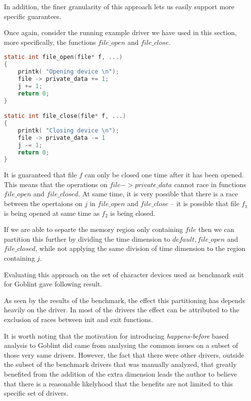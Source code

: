 \documentclass[..thesis.tex]{subfiles}
\begin{document}


In addition, the finer granularity of this approach lets us easily support more specific guarantees.

Once again, consider the running example driver we have used in this section, more specifically, the functions $file\_open$ and $file\_close$.

\begin{lstlisting}[language=c,style=def]
static int file_open(file* f, ...)
{
    printk( "Opening device \n");
    file -> private_data += 1;
    j += 1;
    return 0;
}

static int file_close(file* f, ...)
{
    printk( "Closing device \n");
    file -> private_data -= 1
    j -= 1;
    return 0;
}
\end{lstlisting}

It is guaranteed that file $f$ can only be closed one time after it has been opened. This means that the operations on $file -> private\_data$ cannot race in functions $file\_open$ and $file\_closed$. At same time, it is very possible that there is a race between the opertaions on $j$ in $file\_open$ and $file\_close$ -- it is possible that file $f_1$ is being opened at same time as $f_2$ is being closed. 

If we are able to separte the memory region only containing $file$ then we can partition this further by dividing the time dimension to $default, file\_open$ and $file\_closed$, while not applying the same division of time dimension to the region containing $j$. 


Evaluating this approach on the set of character devices used as benchmark suit for Goblint gave following result.


As seen by the results of the benchmark, the effect this partitioning has depends heavily on the driver. In most of the drivers the effect can be attributed to the exclusion of races between init and exit functions. 


It is worth noting that the motivation for introducing \textit{happens-before} based analysis to Goblint did came from analysing the common issues on a subset of those very same drivers. However, the fact that there were other drivers, outside the subset of the benchmark drivers that was manually analyzed, that greatly benefited from the addition of the extra dimension leads the author to believe that there is a reasonable likelyhood that the benefits are not limited to this specific set of drivers.
\end{document}
